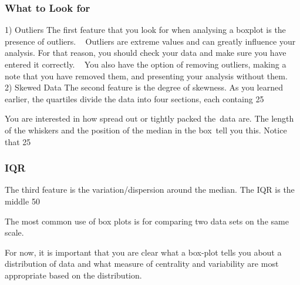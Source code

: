 \documentclass{beamer}
\begin{document}
\begin{frame}
\frametitle{What to Look for}

1) Outliers
The first feature that you look for when analysing a boxplot is the presence of outliers.
 
Outliers are extreme values and can greatly influence your analysis. For that reason, you should check your data and make sure you have entered it correctly.
 
You also have the option of removing outliers, making a note that you have removed them, and presenting your analysis without them.
 
2) Skewed Data
The second feature is the degree of skewness. As you learned earlier, the quartiles divide the data into four sections, each containg 25%

You are interested in how spread out or tightly packed the data are. The length of the whiskers and the position of the median in the box tell you this. Notice that 25%


\end{frame}

\begin{frame}



\frametitle{IQR}
The third feature is the variation/dispersion around the median. The IQR is the middle 50%

The most common use of box plots is for comparing two data sets on the same scale. 

For now, it is important that you are clear what a box-plot tells you about a distribution of data and what measure of centrality and variability are most appropriate based on the distribution.
\end{frame}
\end{document}
